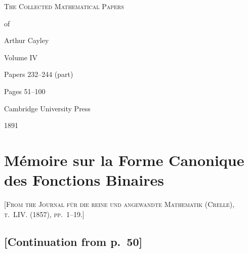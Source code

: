 \documentclass[11pt,a4paper]{book}
\begin{document}
\thispagestyle{empty}
\begin{center}
\vspace*{2cm}
{\Huge\scshape The Collected Mathematical Papers\par\vspace{0.3em} of\par\vspace{0.5em} Arthur Cayley\par\vspace{1.5em}}
{\LARGE Volume IV\par\vspace{1em}}
{\large Papers 232--244 (part)\par\vspace{0.5em}}
{\large Pages 51--100\par\vspace{2em}}
\vfill
{\large Cambridge University Press\par\vspace{0.3em}}
{\normalsize 1891}
\end{center}
\newpage


\newpage

\setcounter{page}{51}




\section{Mémoire sur la Forme Canonique des Fonctions Binaires}

\textsc{[From the Journal für die reine und angewandte Mathematik (Crelle), t.~LIV. (1857), pp.~1--19.]}
\label{paper:232}

\subsection*{[Continuation from p.~50]}
\end{document}
